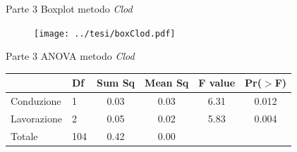 \documentclass[10pt]{beamer}
\begin{document}
\begin{frame}{Parte 3 \small{Boxplot metodo \emph{Clod}}} 
  \begin{figure}
    \texttt{[image: ../tesi/boxClod.pdf]}
  \end{figure}
\end{frame}


\begin{frame}{Parte 3 \small{ ANOVA metodo \emph{Clod}}}
  \begin{table}
    \centering
    \begin{tabular}{llcccc}
      \hline
                  & Df  & Sum Sq & Mean Sq & F value & Pr($>$F) \\ 
      \hline
      Conduzione  & 1   & 0.03   & 0.03    & 6.31    & 0.012    \\ 
      Lavorazione & 2   & 0.05   & 0.02    & 5.83    & 0.004    \\ 
      Totale      & 104 & 0.42   & 0.00    &         &          \\ 
      \hline
    \end{tabular}
    \label{tab:Anova densita per spinta}
  \end{table}
\end{frame}
\end{document}

